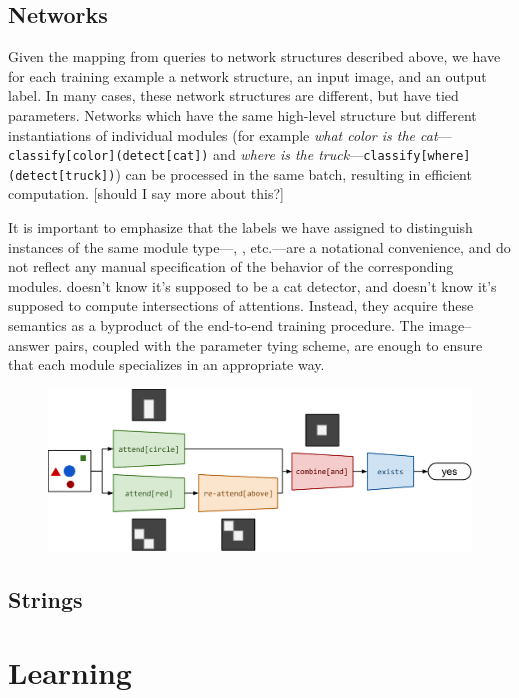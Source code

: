 \documentclass[10pt,twocolumn,letterpaper]{article}
\begin{document}
\subsection{Networks}

Given the mapping from queries to network structures described above, we have for each training example a network structure, an input image, and an output label. In many cases, these network structures are different, but have tied parameters. Networks which have the same high-level structure but different instantiations of individual modules (for example \emph{what color is the cat}---{\small\tt classify[color](detect[cat])} and \emph{where is the truck}---{\small\tt classify[where](detect[truck])}) can be processed in the same batch, resulting in efficient computation. [should I say more about this?]

It is important to emphasize that the labels we have assigned to distinguish instances of the same module type---, , etc.---are a notational convenience, and do not reflect any manual specification of the behavior of the corresponding modules.  doesn't know it's supposed to be a cat detector, and  doesn't know it's supposed to compute intersections of attentions. Instead, they acquire these semantics as a byproduct of the end-to-end training procedure. The image--answer pairs, coupled with the parameter tying scheme, are enough to ensure that each module specializes in an appropriate way.

\begin{figure}
    \includegraphics[width=\textwidth]{fig/full2}
\end{figure}

\subsection{Strings}

\section{Learning}
\end{document}
